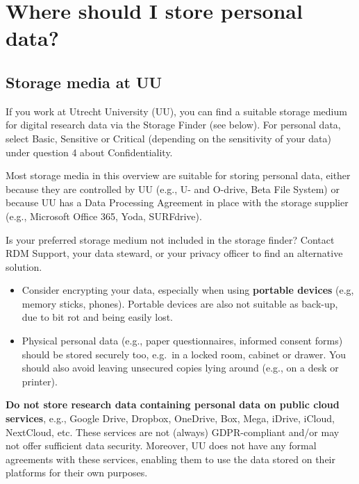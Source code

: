 \documentclass[
]{book}
\providecommand{\tightlist}{%
  \setlength{\itemsep}{0pt}\setlength{\parskip}{0pt}}
\begin{document}
\hypertarget{data-storage-where}{%
\section{Where should I store personal data?}\label{data-storage-where}}

\hypertarget{storage-media-at-uu}{%
\subsection{Storage media at UU}\label{storage-media-at-uu}}

If you work at Utrecht University (UU), you can find a suitable storage medium for
digital research data via the Storage Finder (see below). For personal data, select Basic,
Sensitive or Critical (depending on the sensitivity of your data) under question
4 about Confidentiality.

Most storage media in this overview are suitable for storing personal data, either
because they are controlled by UU (e.g., U- and O-drive, Beta File System) or
because UU has a Data Processing Agreement in place with the storage supplier
(e.g., Microsoft Office 365, Yoda, SURFdrive).

Is your preferred storage medium not included in the storage finder? Contact
RDM Support, your data steward, or your
privacy officer to find an alternative solution.

\begin{itemize}
\tightlist
\item
  Consider encrypting your data, especially when using \textbf{portable devices}
  (e.g, memory sticks, phones). Portable devices are also not suitable as back-up,
  due to bit rot and being easily lost.
\item
  Physical personal data (e.g., paper questionnaires, informed consent forms)
  should be stored securely too, e.g.~in a locked room, cabinet or drawer. You
  should also avoid leaving unsecured copies lying around (e.g., on a desk or printer).
\end{itemize}

\textbf{Do not store research data containing personal data on public cloud services},
e.g., Google Drive, Dropbox, OneDrive, Box, Mega, iDrive, iCloud, NextCloud, etc.
These services are not (always) GDPR-compliant and/or may not offer sufficient
data security. Moreover, UU does not have any formal agreements with these
services, enabling them to use the data stored on their platforms for their own
purposes.
\end{document}
